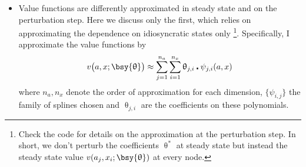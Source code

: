 \documentclass[a4paper,10pt]{article}  %
\begin{document}
\begin{itemize}[leftmargin=0in,label=\raisebox{0.50ex}{\tiny$\bullet$}]
   
   \item Value functions are differently approximated in steady state and on the perturbation step. Here we discuss only the first,
   which relies on approximating the dependence on idiosyncratic states only%
   \footnote{Check the code for details on the approximation at the perturbation step. In short, we don't perturb the coefficients $
   \uptheta^* $ at steady state but instead the steady state value $ v(a_j,x_i; \bsy{\uptheta} ) $ at every node. }. Specifically, I
   approximate the value functions
   by
   \begin{equation}
      \label{eq:approx_value_function}
      v\big( a, x ; \bsy{\uptheta} \big) \approx \sum_{j=1}^{n_a} \sum_{i=1}^{n_x} \uptheta_{j,i} \centerdot \psi_{j,i} (a,x)
   \end{equation}
   where $ n_a, n_x $ denote the order of approximation for each dimension, $ \big\{ \psi_{i,j} \big\} $ the family of splines chosen
   and $ \uptheta_{j,i} $ are the coefficients on these polynomials.


\end{itemize}
\end{document}
